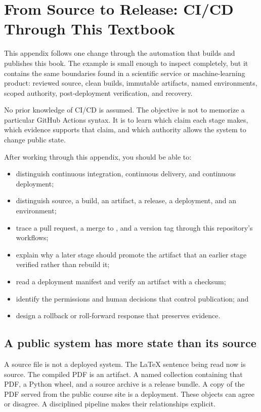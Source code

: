 \chapter{From Source to Release: CI/CD Through This Textbook}
\label{app:cicd}

This appendix follows one change through the automation that builds and
publishes this book. The example is small enough to inspect completely, but it
contains the same boundaries found in a scientific service or machine-learning
product: reviewed source, clean builds, immutable artifacts, named
environments, scoped authority, post-deployment verification, and recovery.

No prior knowledge of CI/CD is assumed. The objective is not to memorize a
particular GitHub Actions syntax. It is to learn which claim each stage makes,
which evidence supports that claim, and which authority allows the system to
change public state.

After working through this appendix, you should be able to:

\begin{itemize}
  \item distinguish continuous integration, continuous delivery, and
  continuous deployment;
  \item distinguish source, a build, an artifact, a release, a deployment, and
  an environment;
  \item trace a pull request, a merge to , and a version tag through
  this repository's workflows;
  \item explain why a later stage should promote the artifact that an earlier
  stage verified rather than rebuild it;
  \item read a deployment manifest and verify an artifact with a checksum;
  \item identify the permissions and human decisions that control publication;
  and
  \item design a rollback or roll-forward response that preserves evidence.
\end{itemize}

\section{A public system has more state than its source}

A source file is not a deployed system. The LaTeX sentence being read now is
source. The compiled PDF is an artifact. A named collection containing that
PDF, a Python wheel, and a source archive is a release bundle. A copy of the PDF
served from the public course site is a deployment. These objects can agree or
disagree. A disciplined pipeline makes their relationships explicit.

